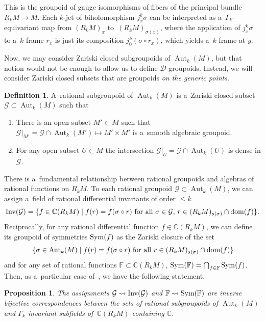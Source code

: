 \documentclass[10pt,a4paper]{amsart}
\numberwithin{equation}{section}
\newtheorem{Proposition}[Theorem]{Proposition}
\theoremstyle{definition}
\newtheorem{Definition}[Theorem]{Definition}
\begin{document}
This is the groupoid of gauge isomorphisms of fibers of the principal bundle $R_kM\to M$. Each $k$-jet of biholomorphism $j_x^k\sigma$ can be interpreted as a~$\Gamma_k$-equivariant map from $(R_kM)_x$ to~$(R_kM)_{\sigma(x)}$, where the application of $j^k_x\sigma$ to a~$k$-frame $r_x$ is just its composition $j_0^k(\sigma\circ r_x)$, which yields a~$k$-frame at $y$.

Now, we may consider Zariski closed subgroupoids of $\operatorname{Aut}_k(M)$, but that notion would not be enough to allow us to define $\mathcal D$-groupoids. Instead, we will consider Zariski closed subsets that are groupoids \emph{on the generic points}.

\begin{Definition} A~rational subgroupoid of $\operatorname{Aut}_k(M)$ is a~Zariski closed subset $\mathcal G \subset \operatorname{Aut}_k(M)$ such that
\begin{enumerate}\itemsep=0pt
 \item[(a)] There is an open subset $M'\subset M$ such that $\mathcal G\vert_{M'} = \mathcal G \cap \operatorname{Aut}_k(M')\mapsto M'\times M'$ is a~smooth algebraic groupoid.
 \item[(b)] For any open subset $U\subset M$ the intersection $\mathcal G\vert_U = \mathcal G \cap \operatorname{Aut}_k(U)$ is dense in $\mathcal G$.
\end{enumerate}
\end{Definition}

There is a~fundamental relationship between rational groupoids and algebras of rational functions on $R_kM$. To each rational groupoid $\mathcal G\subset \operatorname{Aut}_k(M)$, we can assign a~field of rational differential invariants of order $\leq k$
\[{\rm Inv}(\mathcal G) = \{f \in \mathbb C(R_kM)\mid
f(r) = f(\sigma\circ r) \mbox{ for all } \sigma\in \mathcal G,\, r \in (R_kM)_{s(\sigma)} \cap {\rm dom}(f)\}.
\]
Reciprocally, for any rational differential function $f\in \mathbb C(R_kM)$, we can define its groupoid of symmetries ${\rm Sym}(f)$ as the Zariski closure of the set
\[
\{\sigma\in \operatorname{Aut}_k(M) \mid f(r) = f(\sigma\circ r) \mbox{ for all } r\in (R_kM)_{s(\sigma)}\cap {\rm dom}(f)\}
\]
and for any set of rational functions $\mathbb F\subset \mathbb C(R_kM)$,
${\rm Sym}(\mathbb F) = \bigcap_{f\in \mathbb F} {\rm Sym}(f)$.
Then, as a~particular case of~\cite[Proposition~2.18]{bcd2019differential}, we have the following statement.

\begin{Proposition}
 The assignments $\mathcal G \leadsto {\rm Inv}(\mathcal G)$ and $\mathbb F\leadsto {\rm Sym}(\mathbb F)$ are inverse bijective correspondences between the sets of rational subgroupoids of $\operatorname{Aut}_k(M)$ and $\Gamma_k$ invariant subfields of~$\mathbb C(R_kM)$ containing $\mathbb C$.
\end{Proposition}
\end{document}
